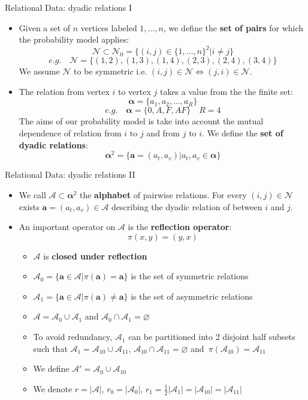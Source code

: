 \documentclass[aspectratio=169,xcolor=dvipsnames]{beamer}
\newcommand{\veca}{\boldsymbol{a}}
\newcommand{\vecalpha}{\boldsymbol{\alpha}}
\newcommand{\setn}{\mathcal{N}}
\newcommand{\seta}{\mathcal{A}}
\begin{document}
\begin{frame}{Relational Data: dyadic relations I}
\begin{itemize}[<+->]
    \item Given a set of $n$ vertices labeled $1, \dots ,n$, we define the \textbf{set of pairs} for which the probability model applies:
    $$\setn \subset \setn_0 = \{ (i,j) \in \{1, \dots ,n\}^2| i\neq j\}$$ 
    \pause \vspace{-15pt}
    $$ e.g. \quad \setn = \{(1,2), (1,3), (1,4), (2,3), (2,4), (3,4) \} $$
    \pause
    We assume $\setn$ to be symmetric i.e. $(i, j) \in \setn \iff (j, i) \in \setn$.
    \pause
    \vspace{5pt}
    \item The relation from vertex $i$ to vertex $j$ takes a value from the the finite set:
    $$ \vecalpha = \{ a_1, a_2, \dots, a_R \}$$
    \pause \vspace{-15pt}
    $$ e.g. \quad \vecalpha = \{0, A, F, AF \} \quad R=4 $$
    \pause
    The aims of our probability model is take into account the mutual dependence of relation from $i$ to $j$ and from $j$ to $i$. We define the \textbf{set of dyadic relations}:
    $$
    \vecalpha^2 = \{ \veca = (a_t, a_v) | a_t, a_v \in \vecalpha\}
    $$
\end{itemize}
\end{frame}
\begin{frame}{Relational Data: dyadic relations II}
\begin{itemize}[<+->]
\item We call $\seta \subset \vecalpha^2$ the \textbf{alphabet} of pairwise relations. For every $(i,j) \in \setn$ exists $\veca = (a_t, a_v) \in \seta$ describing the dyadic relation of between $i$ and $j$.
\item An important operator on $\seta$ is the \textbf{reflection operator}:
$$ 
\pi(x, y) = (y, x)
$$
\vspace{-15pt}
\begin{itemize}%
    \setlength\itemsep{0.4em}
    \item $\seta$ is \textbf{closed under reflection}
    \item $\seta_0 = \{\veca\in\seta | \pi(\veca)=\veca\}$ is the set of symmetric relations
    \item $\seta_1 = \{\veca\in\seta | \pi(\veca)\neq\veca\}$ is the set of asymmetric relations
    \item $\seta = \seta_0\cup \seta_1$ and $\seta_0\cap \seta_1 = \varnothing$
    \item To avoid redundancy, $\seta_1$ can be partitioned into 2 disjoint half subsets such that $\seta_1 = \seta_{10}\cup\seta_{11},\, \seta_{10}\cap\seta_{11} = \varnothing$ and $\, \pi(\seta_{10}) = \seta_{11}$
    \item We define $\seta' = \seta_{0} \cup \seta_{10}$ 
    \item We denote $r = |\seta|,\, r_0 = |\seta_0|, \,r_1 = \frac{1}{2}|\seta_1| = |\seta_{10}| = |\seta_{11}|$
    
\end{itemize}
\end{itemize}
\end{frame}
\end{document}
